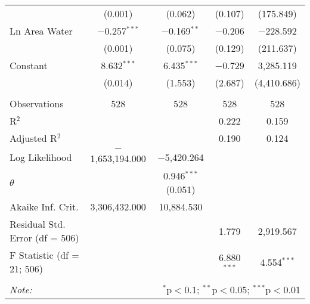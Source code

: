 \begin{table}[!htbp]
\begin{tabular}{@{\extracolsep{5pt}}lcccc}
  & (0.001) & (0.062) & (0.107) & (175.849) \\ 
  Ln Area Water & $-$0.257$^{***}$ & $-$0.169$^{**}$ & $-$0.206 & $-$228.592 \\ 
  & (0.001) & (0.075) & (0.129) & (211.637) \\ 
  Constant & 8.632$^{***}$ & 6.435$^{***}$ & $-$0.729 & 3,285.119 \\ 
  & (0.014) & (1.553) & (2.687) & (4,410.686) \\ 
 \hline \\[-1.8ex] 
Observations & 528 & 528 & 528 & 528 \\ 
R$^{2}$ &  &  & 0.222 & 0.159 \\ 
Adjusted R$^{2}$ &  &  & 0.190 & 0.124 \\ 
Log Likelihood & $-$1,653,194.000 & $-$5,420.264 &  &  \\ 
$\theta$ &  & 0.946$^{***}$  (0.051) &  &  \\ 
Akaike Inf. Crit. & 3,306,432.000 & 10,884.530 &  &  \\ 
Residual Std. Error (df = 506) &  &  & 1.779 & 2,919.567 \\ 
F Statistic (df = 21; 506) &  &  & 6.880$^{***}$ & 4.554$^{***}$ \\ 
\hline 
\hline \\[-1.8ex] 
\textit{Note:}  & \multicolumn{4}{r}{$^{*}$p$<$0.1; $^{**}$p$<$0.05; $^{***}$p$<$0.01} \\ 
\end{tabular} 
\end{table} 
